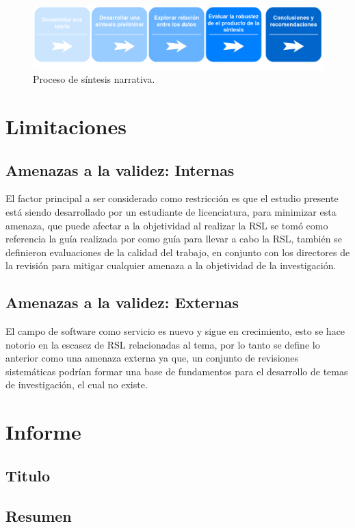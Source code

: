 \documentclass{article}
\begin{document}
\begin{figure}[!htb]
   \includegraphics[width=\linewidth]{narrativa.png}
   \caption{Proceso de síntesis narrativa.}
   \label{fig:sistesisnarrativa}
\end{figure}

\newpage

\section{Limitaciones}
\subsection{Amenazas a la validez: Internas}
El factor principal a ser considerado como restricción es que el estudio presente está siendo 
desarrollado por un estudiante de licenciatura, para minimizar esta amenaza, que puede afectar a la objetividad 
al realizar la RSL se tomó como referencia la guía realizada por \cite{kitchenham2007guidelines}
como guía para llevar a cabo la RSL, también se definieron evaluaciones de la calidad del trabajo, en conjunto 
con los directores de la revisión para mitigar cualquier amenaza a la objetividad de la investigación. 

\subsection{Amenazas a la validez: Externas}
El campo de software como servicio es nuevo y sigue en crecimiento, esto se hace notorio en la escasez de 
RSL relacionadas al tema, por lo tanto se define lo anterior como  una amenaza externa ya que, un conjunto 
de revisiones sistemáticas podrían formar una base de fundamentos para el desarrollo de temas de investigación, el cual no existe.
\newpage

\section{Informe}
\subsection{Titulo}
\subsection{Resumen}
\end{document}
